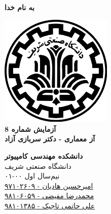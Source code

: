 \documentclass{article}
\begin{document}
\begin{titlepage}
	\begin{center}
		\textbf{ \Huge{به نام خدا}}	
		\vspace{0.2cm}
		
		\includegraphics[width=0.4\textwidth]{sharif.png}\\
		\vspace{0.2cm}
		\textbf{ \Huge{آزمایش شماره 8}}\\
		\vspace{0.25cm}
		\textbf{ \Large{آز معماری - دکتر سربازی آزاد}}
		\vspace{0.2cm}
		
		
		\large \textbf{دانشکده مهندسی کامپیوتر}\\\vspace{0.1cm}
		\large   دانشگاه صنعتی شریف\\\vspace{0.2cm}
		\large   ﻧﯿﻢ‌سال اول ۰۰-۰۱ \\\vspace{0.10cm}
		\large{\href{mailto:a.h.hadian@gmail.com}{امیرحسین هادیان - ۹۷۱۰۲۶۰۹}}\\
		\large{\href{mailto:mofayezi.m@gmail.com}{محمدرضا مفیضی - ۹۸۱۰۶۰۵۹}}\\
		\large{\href{mailto:a.hatam008@gmail.com}{علی حاتمی تاجیک - ۹۸۱۰۱۳۸۵}}\\
	\end{center}
\end{titlepage}

\newpage

\pagestyle{fancy}
\fancyhf{}
\fancyfoot{}
\setlength{\headheight}{59pt}
\cfoot{\thepage}
\end{document}

